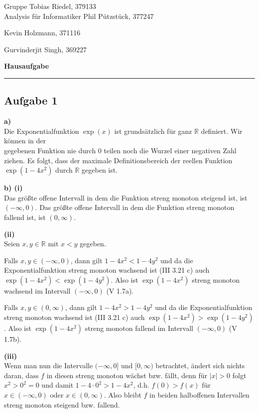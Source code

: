 \documentclass[a4paper,graphics,11pt]{article}
\newcommand{\aufgabe}[1]{\subsection*{Aufgabe #1}}
\begin{document}
\noindent Gruppe              \hfill Tobias Riedel, 379133 \\
\noindent Analysis für Informatiker             \hfill Phil Pützstück, 377247 \\
\strut\hfill Kevin Holzmann, 371116\\
\strut\hfill Gurvinderjit Singh, 369227
\begin{center}
	\LARGE{\textbf{Hausaufgabe }}
\end{center}
\begin{center}
\rule[0.1ex]{\textwidth}{1pt}
\end{center}



\aufgabe{1}
\textbf{a)}\\
Die Exponentialfunktion $\exp(x)$ ist grundsätzlich für ganz $\mathbb{R}$ definiert.
Wir können in der\\
gegebenen Funktion nie durch 0 teilen noch die Wurzel einer
negativen Zahl ziehen. Es folgt, dass der maximale Definitionsbereich der
reellen Funktion $\exp(1-4x^2)$ durch $\mathbb{R}$ gegeben ist.

\textbf{b) (i)}\\
Das größte offene Intervall in dem die Funktion streng monoton steigend ist, ist
$(-\infty, 0)$. Das größte offene Intervall in dem die Funktion streng monoton
fallend ist, ist $(0, \infty)$.

\textbf{(ii)}\\
Seien $x,y \in \mathbb{R}$ mit $x<y$ gegeben.

Falls $x,y \in (-\infty, 0)$, dann gilt $1-4x^2 < 1-4y^2$ und da die Exponentialfunktion
streng monoton wachsend ist (III 3.21 c) auch $\exp(1-4x^2) < \exp(1-4y^2)$.
Also ist $\exp(1-4x^2)$ streng monoton wachsend im Intervall $(-\infty, 0)$ (V 1.7a).

Falls $x,y \in (0, \infty)$, dann gilt $1-4x^2 > 1-4y^2$ und da die Exponentialfunktion
streng monoton wachsend ist (III 3.21 c) auch $\exp(1-4x^2) > \exp(1-4y^2)$.
Also ist $\exp(1-4x^2)$ streng monoton fallend im Intervall $(-\infty, 0)$ (V 1.7b).

\textbf{(iii)}\\
Wenn man nun die Intervalle $(-\infty, 0]$ und $[0, \infty)$ betrachtet, ändert sich
nichts daran, dass $f$ in diesen streng monoton wächst bzw. fällt, denn für
$|x| > 0$ folgt $x^2 > 0^2 = 0$ und damit $1-4\cdot0^2 > 1-4x^2$, d.h.
$f(0) > f(x)$ für $x \in (-\infty, 0)$ oder $x \in (0, \infty)$. Also
bleibt $f$ in beiden halboffenen Intervallen streng monoton steigend bzw. fallend.
\end{document}
